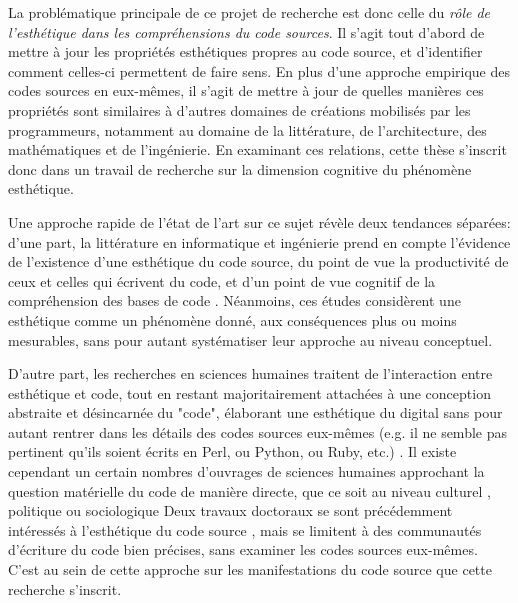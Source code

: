 \documentclass{article}
\begin{document}
La problématique principale de ce projet de recherche est donc celle du \emph{rôle de l'esthétique dans les compréhensions du code sources}. Il s'agit tout d'abord de mettre à jour les propriétés esthétiques propres au code source, et d'identifier comment celles-ci permettent de faire sens. En plus d'une approche empirique des codes sources en eux-mêmes, il s'agit de mettre à jour de quelles manières ces propriétés sont similaires à d'autres domaines de créations mobilisés par les programmeurs, notamment au domaine de la littérature, de l'architecture, des mathématiques et de l'ingénierie. En examinant ces relations, cette thèse s'inscrit donc dans un travail de recherche sur la dimension cognitive du phénomène esthétique.

Une approche rapide de l'état de l'art sur ce sujet révèle deux tendances séparées: d'une part, la littérature en informatique et ingénierie prend en compte l'évidence de l'existence d'une esthétique du code source, du point de vue la productivité de ceux et celles qui écrivent du code, et d'un point de vue cognitif de la compréhension des bases de code \citep{oram_beautiful_2007,cox_programming_2009,gabriel_mob_2001,martin_clean_2008,detienne_software_2012,weinberg_psychology_1998}.  Néanmoins, ces études considèrent une esthétique comme un phénomène donné, aux conséquences plus ou moins mesurables, sans pour autant systématiser leur approche au niveau conceptuel.

D'autre part, les recherches en sciences humaines traitent de l'interaction entre esthétique et code, tout en restant majoritairement attachées à une conception abstraite et désincarnée du "code", élaborant une esthétique du digital sans pour autant rentrer dans les détails des codes sources eux-mêmes (e.g. il ne semble pas pertinent qu'ils soient écrits en Perl, ou Python, ou Ruby, etc.) \citep{cramer_exe_2019,hayles_my_2010,mackenzie_cutting_2006,levy_programmation_1992}. Il existe cependant un certain nombres d'ouvrages de sciences humaines approchant la question matérielle du code de manière directe, que ce soit au niveau culturel \citep{montfort_10_2014}, politique \citep{cox_speaking_2013} ou sociologique \citep{paloque-berges_poetique_2009} Deux travaux doctoraux se sont précédemment intéressés à l'esthétique du code source \citep{black_art_2002,pineiro_aesthetics_2003}, mais se limitent à des communautés d'écriture du code bien précises, sans examiner les codes sources eux-mêmes. C'est au sein de cette approche sur les manifestations du code source que cette recherche s'inscrit.
\end{document}
